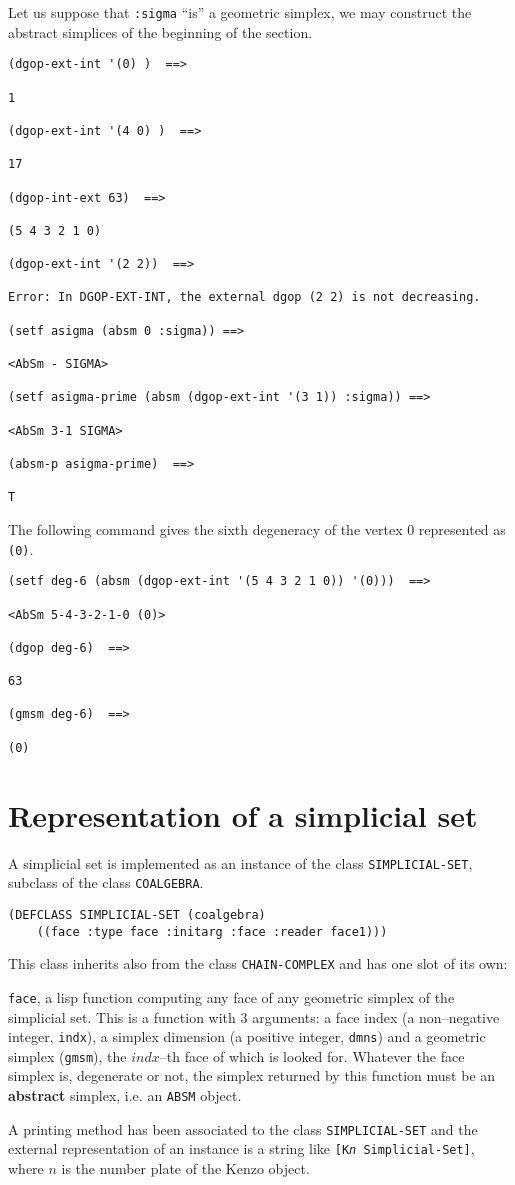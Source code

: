 Let us suppose that {\tt :sigma} ``is'' a geometric simplex,
we may construct the abstract simplices of the beginning of the section.
{\footnotesize\begin{verbatim}
(dgop-ext-int '(0) )  ==>

1

(dgop-ext-int '(4 0) )  ==>

17

(dgop-int-ext 63)  ==>

(5 4 3 2 1 0)

(dgop-ext-int '(2 2))  ==>

Error: In DGOP-EXT-INT, the external dgop (2 2) is not decreasing.

(setf asigma (absm 0 :sigma)) ==>

<AbSm - SIGMA>

(setf asigma-prime (absm (dgop-ext-int '(3 1)) :sigma)) ==>

<AbSm 3-1 SIGMA>

(absm-p asigma-prime)  ==>

T
\end{verbatim}}
The following  command gives
the sixth degeneracy of the vertex $0$ represented as {\tt (0)}.
{\footnotesize\begin{verbatim}
(setf deg-6 (absm (dgop-ext-int '(5 4 3 2 1 0)) '(0)))  ==>

<AbSm 5-4-3-2-1-0 (0)>

(dgop deg-6)  ==>

63

(gmsm deg-6)  ==>

(0)

\end{verbatim}}


\section {Representation of a simplicial set}

A simplicial set is implemented as an instance of the
class  {\tt SIMPLICIAL-SET}, subclass of the class {\tt COALGEBRA}.
{\footnotesize\begin{verbatim}
(DEFCLASS SIMPLICIAL-SET (coalgebra)
    ((face :type face :initarg :face :reader face1)))
\end{verbatim}}
This class inherits also from the class {\tt CHAIN-COMPLEX} and has one slot of its own:
\begin{description}
\item {{\tt face}}, a lisp function  computing any face of any geometric simplex of the simplicial set.
This is a function with $3$ arguments: a face index (a non--negative integer, {\tt indx}), a simplex dimension
(a positive integer, {\tt dmns}) and a geometric simplex ({\tt gmsm}), the $indx$--th face of which
is looked for. Whatever the face simplex is, degenerate or not, the simplex returned by this function
must be an {\bf abstract} simplex, i.e. an {\tt ABSM} object.
\end{description}
A printing method has been associated to the class {\tt SIMPLICIAL-SET}
and the external representation of  an instance is a string like {\tt [K{\em n} Simplicial-Set]}, where $n$
is the number plate of the Kenzo object.

